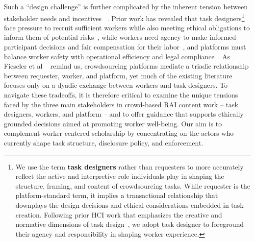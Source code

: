 Such a ``design challenge'' is further complicated by the inherent tension between stakeholder needs and incentives ~\cite{finnerty2013keep, gaikwad2016boomerang, salehi2015we, irani2013turkopticon, salehi2018ink}. Prior work has revealed that task designers\footnote{We use the term \textbf{task designers} rather than requesters to more accurately reflect the active and interpretive role individuals play in shaping the structure, framing, and content of crowdsourcing tasks. While requester is the platform-standard term, it implies a transactional relationship that downplays the design decisions and ethical considerations embedded in task creation. Following prior HCI work that emphasizes the creative and normative dimensions of task design~\cite{bragg2018sprout, qian2025locating}, we adopt task designer to foreground their agency and responsibility in shaping worker experience.} face pressure to recruit sufficient workers while also meeting ethical obligations to inform them of potential risks~\cite{qian2025locating, finnerty2013keep, kittur2008crowdsourcing, zheng2011task, bragg2018sprout}, while workers need agency to make informed participant decisions and fair compensation for their labor~\cite{irani2013turkopticon, salehi2018ink, martin2014being, silberman2018responsible, toxtli2021quantifying, schlicher2021flexible}, and platforms must balance worker safety with operational efficiency and legal compliance~\cite{gaikwad2016boomerang, xu2017incentivizing, xia2020privacy, allen2018design}. 
As Fieseler et al ~\cite{fieseler_unfairness_2019} remind us, crowdsourcing platforms mediate a triadic relationship between requester, worker, and platform, yet much of the existing literature focuses only on a dyadic exchange between workers and task designers.
To navigate these tradeoffs, it is therefore critical to examine the unique tensions faced by the three main stakeholders in crowd-based RAI content work -- task designers, workers, and platform -- and to offer guidance that supports ethically grounded decisions aimed at promoting worker well-being. Our aim is to complement worker-centered scholarship by concentrating on the actors who currently shape task structure, disclosure policy, and enforcement.

